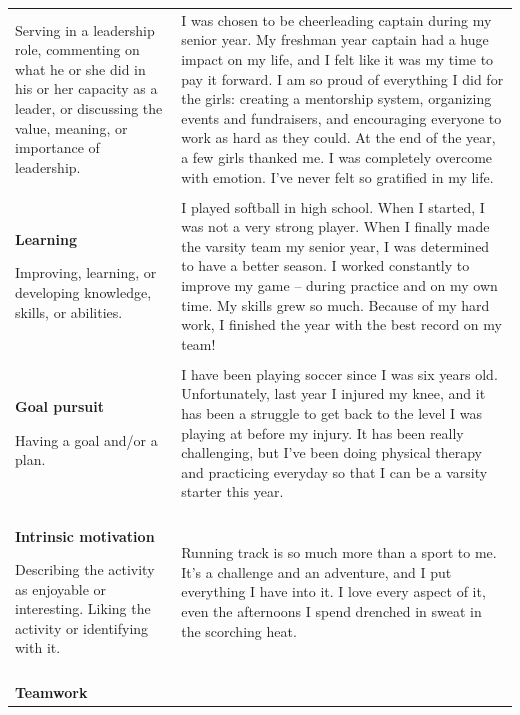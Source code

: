 \documentclass[11pt]{report}
\begin{document}
\begin{mainf}
\begin{table}
\begin{tabular}{  p{.275\linewidth}  p{.675\linewidth}}
Serving in a leadership role, commenting on what he or she did in his or her capacity as a leader, or discussing the value, meaning, or importance of leadership.                            & I was chosen to be cheerleading captain during my senior year. My freshman year captain had a huge impact on my life, and I felt like it was my time to pay it forward. I am so proud of everything I did for the girls: creating a mentorship system, organizing events and fundraisers, and encouraging everyone to work as hard as they could. At the end of the year, a few girls thanked me. I was completely overcome with emotion. I’ve never felt so gratified in my life. \\ \\
\textbf{Learning}

Improving, learning, or developing knowledge, skills, or abilities.                                                                                                                       & I played softball in high school. When I started, I was not a very strong player. When I finally made the varsity team my senior year, I was determined to have a better season. I worked constantly to improve my game – during practice and on my own time. My skills grew so much. Because of my hard work, I finished the year with the best record on my team!                                                                                                                \\ \\
\textbf{Goal pursuit}

Having a goal and/or a plan.                                                                                                                                                              & I have been playing soccer since I was six years old. Unfortunately, last year I injured my knee, and it has been a struggle to get back to the level I was playing at before my injury. It has been really challenging, but I’ve been doing physical therapy and practicing everyday so that I can be a varsity starter this year.                                                                                                                                                \\ \\
\textbf{Intrinsic motivation}

Describing the activity as enjoyable or interesting. Liking the activity or identifying with it.                                                                                         & Running track is so much more than a sport to me. It’s a challenge and an adventure, and I put everything I have into it. I love every aspect of it, even the afternoons I spend drenched in sweat in the scorching heat.                                                                                                                                                                                                                 \\ \\
\textbf{Teamwork}


\end{tabular}
\end{table}
\end{mainf}
\end{document}
